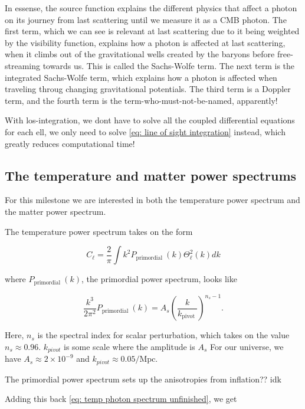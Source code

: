 \documentclass[12pt]{article}
\begin{document}
In essense, the source function explains the different physics that affect a photon on its journey from last scattering until we measure it as a CMB photon. The first term, which we can see is relevant at last scattering due to it being weighted by the visibility function, explains how a photon is affected at last scattering, when it climbs out of the gravitational wells created by the baryons before free-streaming towards us. This is called the Sachs-Wolfe term. The next term is the integrated Sachs-Wolfe term, which explains how a photon is affected when traveling throug changing gravitational potentials. The third term is a Doppler term, and the fourth term is the term-who-must-not-be-named, apparently!

With los-integration, we dont have to solve all the coupled differential equations for each ell, we only need to solve \cref{eq: line of sight integration} instead, which greatly reduces computational time!

\subsection{The temperature and matter power spectrums}
For this milestone we are interested in both the temperature power spectrum and the matter power spectrum. 

The temperature power spectrum takes on the form 

\begin{equation}\label{eq: temp photon spectrum unfinished}
    C_{\ell}=\frac{2}{\pi} \int k^{2} P_{\text {primordial }}(k) \Theta_{\ell}^{2}(k) d k
\end{equation}

where $P_{\text {primordial }}(k)$, the primordial power spectrum, looks like

\begin{equation}
\frac{k^{3}}{2 \pi^{2}} P_{\text {primordial }}(k)=A_{s}\left(\frac{k}{k_{\text {pivot }}}\right)^{n_{s}-1}.
\end{equation}

Here, $n_s$ is the spectral index for scalar perturbation, which takes on the value $n_s \approx 0.96$. $k_{pivot}$ is some scale where the amplitude is $A_s$ For our universe, we have $A_s \approx 2\times10^{-9}$ and $k_{pivot} \approx 0.05/\mathrm{Mpc}$.


The primordial power spectrum sets up the anisotropies from inflation?? idk 

Adding this back \cref{eq: temp photon spectrum unfinished}, we get
\end{document}
